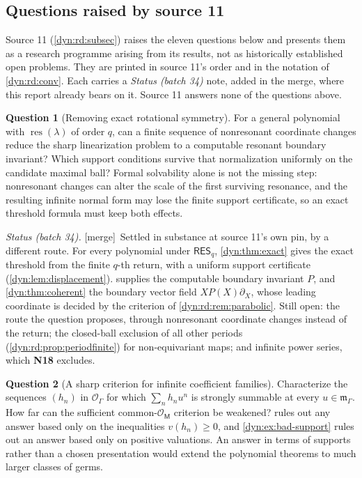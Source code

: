 \documentclass[11pt,letterpaper]{article}
\theoremstyle{definition}
\newtheorem{question}[question]{Question}
\theoremstyle{remark}
\newcommand{\OO}{\mathcal O}
\newcommand{\m}{\mathfrak m}
\newcommand{\res}{\operatorname{res}}
\newcommand{\resq}{\mathsf{RES}_q}
\newcommand{\mergetag}{\textup{\textsf{\small[merge]}}}%
\numberwithin{equation}{section}
\begin{document}
\subsection*{Questions raised by source 11}

Source 11 (\cref{dyn:rd:subsec}) raises the eleven questions below and
presents them as a research programme arising from its results, not as
historically established open problems. They are printed in source 11's
order and in the notation of \cref{dyn:rd:conv}. Each carries a
\emph{Status (batch 34)} note, added in the merge, where this report already
bears on it. Source 11 answers none of the questions above.

\begin{question}[Removing exact rotational symmetry]\label{dyn:rd:q:symmetry}
For a general polynomial with $\res(\lambda)$ of order $q$, can a finite
sequence of nonresonant coordinate changes reduce the sharp linearization
problem to a computable resonant boundary invariant? Which support
conditions survive that normalization uniformly on the candidate maximal
ball? Formal solvability alone is not the missing step: nonresonant changes
can alter the scale of the first surviving resonance, and the resulting
infinite normal form may lose the finite support certificate, so an exact
threshold formula must keep both effects.

\emph{Status (batch 34).} \mergetag\ Settled in substance at source 11's
own pin, by a different route. For every polynomial under $\resq$,
\cref{dyn:thm:exact} gives the exact threshold from the finite $q$-th
return, with a uniform support certificate (\cref{dyn:lem:displacement}).
 supplies the computable boundary invariant $P$, and
\cref{dyn:thm:coherent} the boundary vector field $XP(X)\partial_X$, whose
leading coordinate is decided by the criterion of
\cref{dyn:rd:rem:parabolic}. Still open: the route the question proposes,
through nonresonant coordinate changes instead of the return; the
closed-ball exclusion of all other periods (\cref{dyn:rd:prop:periodfinite})
for non-equivariant maps; and infinite power series, which
\textbf{N18} excludes.
\end{question}

\begin{question}[A sharp criterion for infinite coefficient families]
\label{dyn:rd:q:infinite}
Characterize the sequences $(h_n)$ in $\OO_\Gamma$ for which
$\sum_nh_nu^{n}$ is strongly summable at every $u\in\m_\Gamma$. How far can
the sufficient common-$\OO_{\mathsf M}$ criterion be weakened?
 rules out any answer based only on the
inequalities $v(h_n)\ge0$, and \cref{dyn:ex:bad-support} rules out an
answer based only on positive valuations. An answer in terms of supports
rather than a chosen presentation would extend the polynomial theorems to
much larger classes of germs.
\end{question}
\end{document}
